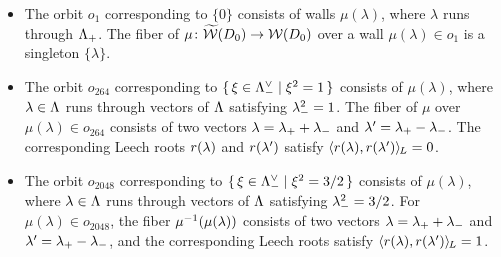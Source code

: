 \documentclass{amsart} %
\begin{document}
\begin{itemize}
\item[($1$)]
The orbit $o_1$ corresponding to $\{0\}$
consists of walls $\mu(\lambda)$,
where $\lambda$ runs through $\Lambda_{+}$.
The fiber of $\mu\colon \widetilde{\mathord{\mathcal{W}}}(D_0)\to\mathord{\mathcal{W}}(D_0)$ 
over a wall $\mu(\lambda)\in o_1$ is a singleton $\{\lambda\}$.
%
\item[($264$)]
The orbit $o_{264}$ corresponding to $\{\,{\xi\in \Lambda_{-}^{\vee}}\mid {\xi^2=1} \,\}$
consists of $\mu(\lambda)$,
where $\lambda\in \Lambda$ runs through
vectors of $\Lambda$ satisfying ${\lambda}_{-}^2=1$.
The fiber of $\mu$ 
over $\mu(\lambda)\in o_{264}$ consists 
of two vectors
$\lambda={\lambda}_{+}+{\lambda}_{-}$ and $\lambda^{\prime}={\lambda}_{+}-{\lambda}_{-}$.
The corresponding Leech roots 
$r(\lambda)$ and $r(\lambda^{\prime})$ satisfy
$\langle r(\lambda), r(\lambda^{\prime}) \rangle_{\hskip -1pt L}=0$.
%
\item[($2048$)]
The orbit $o_{2048}$ corresponding to $\{\,{\xi\in \Lambda_{-}^{\vee}}\mid {\xi^2=3/2} \,\}$
consists of $\mu(\lambda)$,
where $\lambda\in \Lambda$ runs through
vectors of $\Lambda$ satisfying ${\lambda}_{-}^2=3/2$.
For $\mu(\lambda)\in o_{2048}$, the fiber
 $\mu^{-1}(\mu(\lambda))$ consists 
of two vectors
$\lambda={\lambda}_{+}+{\lambda}_{-}$ and $\lambda^{\prime}={\lambda}_{+}-{\lambda}_{-}$, and 
the corresponding Leech roots 
 satisfy
$\langle r(\lambda), r(\lambda^{\prime}) \rangle_{\hskip -1pt L}=1$.

\end{itemize}
%
\end{document}
